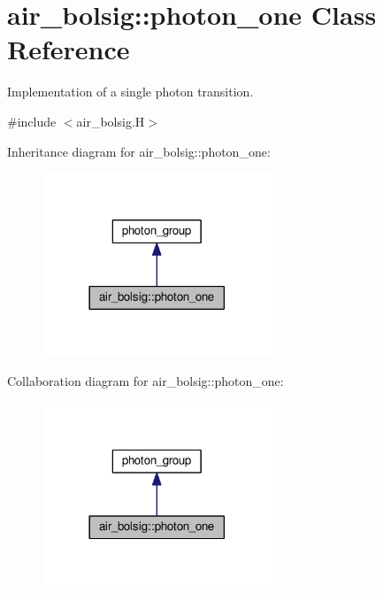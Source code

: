 \hypertarget{classair__bolsig_1_1photon__one}{}\section{air\+\_\+bolsig\+:\+:photon\+\_\+one Class Reference}
\label{classair__bolsig_1_1photon__one}


Implementation of a single photon transition.  




{\ttfamily \#include $<$air\+\_\+bolsig.\+H$>$}



Inheritance diagram for air\+\_\+bolsig\+:\+:photon\+\_\+one\+:\nopagebreak
\begin{figure}[H]
\begin{center}
\leavevmode
\includegraphics[width=194pt]{classair__bolsig_1_1photon__one__inherit__graph}
\end{center}
\end{figure}


Collaboration diagram for air\+\_\+bolsig\+:\+:photon\+\_\+one\+:\nopagebreak
\begin{figure}[H]
\begin{center}
\leavevmode
\includegraphics[width=194pt]{classair__bolsig_1_1photon__one__coll__graph}
\end{center}
\end{figure}
